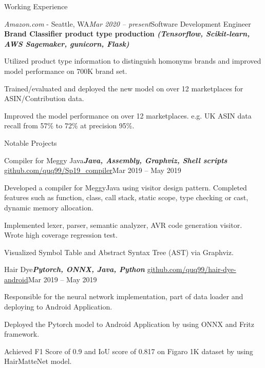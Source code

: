 \documentclass{resume} %
\begin{document}
\begin{rSection}{Working Experience}
\begin{rSubsection}{\textit{Amazon.com} - Seattle, WA}{\textit{Mar 2020 -- present}}{Software Development Engineer}
\textbf{Brand Classifier product type production \textit{(Tensorflow, Scikit-learn, AWS Sagemaker, gunicorn, Flask)}}
\item Utilized product type information to distinguish homonyms brands and improved model performance on 700K brand set.
\item Trained/evaluated and deployed the new model on over 12 marketplaces for ASIN/Contribution data.
\item Improved the model performance on over 12 marketplaces. e.g. UK ASIN data recall from 57\% to 72\% at precision 95\%.

\end{rSubsection} 



\end{rSection}

\begin{rSection}{\sc Notable Projects}
\begin{rSubsection}{Compiler for Meggy Java}{\textbf{\textit{Java, Assembly, Graphviz, Shell scripts}}}{{\Large\href{https://github.com/quq99/Sp19_compiler}\faGithub}  \href{https://github.com/quq99/Sp19_compiler}{github.com/quq99/Sp19\_compiler}}{Mar 2019 -- May 2019}
\item Developed a compiler for MeggyJava using visitor design pattern. Completed features such as function, class, call stack, static scope, type checking or cast, dynamic memory allocation. 
\item Implemented lexer, parser, semantic analyzer, AVR code generation visitor. Wrote high coverage regression test.
\item Visualized Symbol Table and Abstract Syntax Tree (AST) via Graphviz. 
\end{rSubsection}

\iftrue
\begin{rSubsection}{Hair Dye}{\textbf{\textit{Pytorch, ONNX, Java, Python}}}{{\Large\href{https://github.com/quq99/hair-dye-android}\faGithub}  \href{https://github.com/quq99/hair-dye-android}{github.com/quq99/hair-dye-android}}{Mar 2019 -- May 2019}
\item Responsible for the neural network implementation, part of data loader and deploying to Android Application.
\item Deployed the Pytorch model to Android Application by using ONNX and Fritz framework.
\item Achieved F1 Score of 0.9 and IoU score of 0.817 on Figaro 1K dataset by using HairMatteNet model.
\end{rSubsection}
\fi


\end{rSection}
\end{document}

